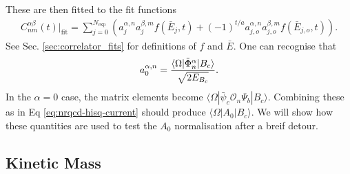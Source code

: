 These are then fitted to the fit functions 
\begin{align}
  C^{\alpha\beta}_{nm}(t)|_{\text{fit}} = \sum_{j=0}^{N_{\text{exp}}} \left( a^{\alpha,n}_j a^{\beta,m}_j f(\bar{E}_j,t) + (-1)^{t/a} a^{\alpha,n}_{j,o} a^{\beta,m}_{j,o} f(\bar{E}_{j,o},t) \right).
  \label{eq:2ptfit_wsmears}
\end{align}
See Sec. \ref{sec:correlator_fits} for definitions of $f$ and $\bar{E}$. One can recognise that
\begin{align}
  a_0^{\alpha,n} = {\langle \Omega | \tilde{\Phi}^{\alpha}_n | B_c \rangle \over \sqrt{2 E_{B_c}}}.
\end{align}
In the $\alpha=0$ case, the matrix elements become $\langle \Omega | \bar{\psi}_c \mathcal{O}_n \Psi_b | B_c \rangle$. Combining these as in Eq \eqref{eq:nrqcd-hisq-current} should produce $\langle \Omega | A_0 | B_c \rangle$. We will show how these quantities are used to test the $A_0$ normalisation after a breif detour.


\subsection{Kinetic Mass}
\label{sec:kinetic_mass}

